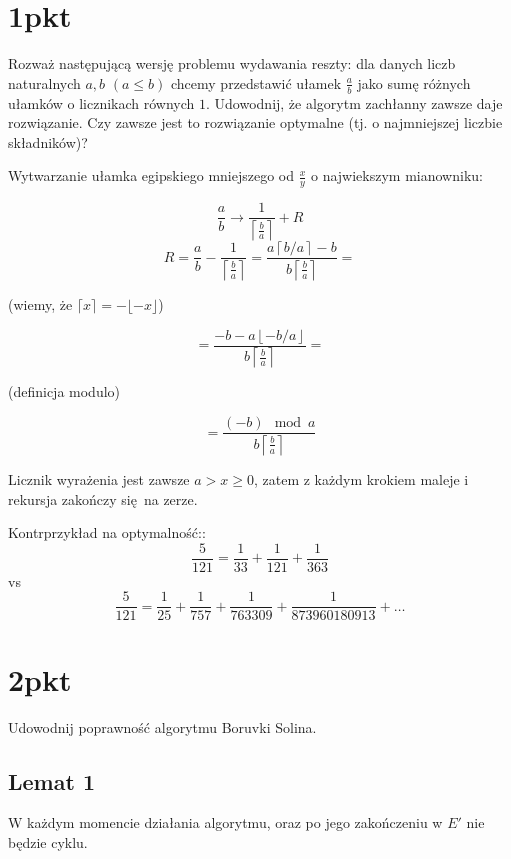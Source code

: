 \documentclass[svgnames]{report}
\begin{document}
\section{1pkt}
\begin{framed}
Rozważ następującą wersję problemu wydawania reszty: dla danych liczb naturalnych
$a, b$ $(a \leq b)$ chcemy przedstawić ułamek $\frac{a}{b}$ jako sumę różnych ułamków o licznikach równych
$1$. Udowodnij, że algorytm zachłanny zawsze daje rozwiązanie. Czy zawsze jest to rozwiązanie optymalne (tj. o najmniejszej liczbie składników)?
\end{framed}

Wytwarzanie ułamka egipskiego mniejszego od $\frac{x}{y}$ o najwiekszym mianowniku:

$$\frac{a}{b} \rightarrow \frac{1}{\left\lceil \frac{b}{a} \right\rceil} + R$$
$$
 R =\frac{a}{b} - \frac{1}{\left\lceil \frac{b}{a} \right\rceil} = \frac{a \left\lceil b / a \right\rceil -b }{b\left\lceil \frac{b}{a} \right\rceil} = 
$$

(wiemy, że $\lceil x \rceil = - \lfloor - x \rfloor$)

$$ = \frac{-b  - a \left\lfloor -b / a \right\rfloor }{b\left\lceil \frac{b}{a} \right\rceil} = $$

(definicja modulo)

$$ = \frac{(-b)\mod a }{b\left\lceil \frac{b}{a} \right\rceil}$$

Licznik wyrażenia jest zawsze $a > x \geq 0$, zatem z każdym krokiem maleje i rekursja zakończy się na zerze.


\noindent Kontrprzykład na optymalność::
$$\frac{5}{121}=\frac{1}{33}+\frac{1}{121}+\frac{1}{363} $$
vs
$$\frac{5}{121}= \frac{1}{25} + \frac{1}{757} + \frac{1}{763309} + \frac{1}{873960180913} + \dots $$




\section{2pkt}
\begin{framed}
Udowodnij poprawność algorytmu Boruvki Solina.
\end{framed}


\subsection{Lemat 1}
\noindent W każdym momencie działania algorytmu, oraz po jego zakończeniu w $E'$ nie będzie cyklu.\\
\end{document}
